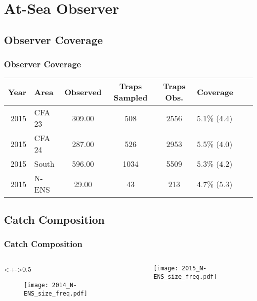 

\section{At-Sea Observer}
\subsection{Observer Coverage}

\begin{frame}
\frametitle{Observer Coverage}

\begin{table}[ht]
\centering
\begin{tabular}{rlccclrr}
  \hline
  Year & Area & Observed & Traps Sampled & Traps Obs. & Coverage \\ 
  \hline
 2015 & CFA 23 & 309.00 & 508 & 2556 & 5.1\% (4.4) \\ 
 2015 & CFA 24 & 287.00 & 526 & 2953 & 5.5\% (4.0)\\ 
 2015 & South & 596.00 & 1034 & 5509 & 5.3\% (4.2)\\ 
 2015 & N-ENS & 29.00 & 43 & 213 & 4.7\% (5.3)\\ 
   \hline
\end{tabular}
\end{table}


\end{frame}



\subsection{Catch Composition}

\begin{frame}
\frametitle{Catch Composition}

\begin{columns}
\begin{column}<+->{0.5\textwidth}
 \vspace*{-0.5cm}
\begin{figure}
\centerline{\texttt{[image: 2014\_N-ENS\_size\_freq.pdf]}}

\end{figure}
\end{column}

\begin{column}{0.5\textwidth}
\begin{figure}
 \vspace*{-0.5cm}

\centerline{\texttt{[image: 2015\_N-ENS\_size\_freq.pdf]}}

 \end{figure}

\end{column}
\end{columns}


\end{frame}

